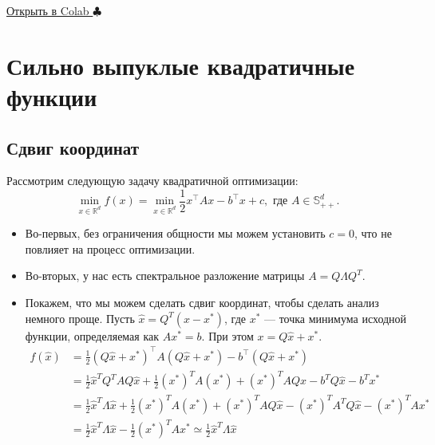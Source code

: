 \documentclass[
  russian,
  letterpaper,
  DIV=11,
  numbers=noendperiod]{scrartcl}
\providecommand{\tightlist}{%
  \setlength{\itemsep}{0pt}\setlength{\parskip}{0pt}}
\begin{document}
\href{https://colab.research.google.com/github/MerkulovDaniil/optim/blob/master/assets/Notebooks/Steepest_descent.ipynb}{Открыть
в Colab \(\clubsuit\)}

\section{Сильно выпуклые квадратичные
функции}\label{ux441ux438ux43bux44cux43dux43e-ux432ux44bux43fux443ux43aux43bux44bux435-ux43aux432ux430ux434ux440ux430ux442ux438ux447ux43dux44bux435-ux444ux443ux43dux43aux446ux438ux438}

\subsection{Сдвиг
координат}\label{ux441ux434ux432ux438ux433-ux43aux43eux43eux440ux434ux438ux43dux430ux442}

Рассмотрим следующую задачу квадратичной оптимизации: \[
\label{problem}
\min\limits_{x \in \mathbb{R}^d} f(x) =  \min\limits_{x \in \mathbb{R}^d} \dfrac{1}{2} x^\top  A x - b^\top  x + c, \text{ где } A \in \mathbb{S}^d_{++}.
\]

\begin{itemize}
\tightlist
\item
  Во-первых, без ограничения общности мы можем установить \(c = 0\), что
  не повлияет на процесс оптимизации.
\item
  Во-вторых, у нас есть спектральное разложение матрицы
  \(A = Q \Lambda Q^T\).
\item
  Покажем, что мы можем сделать сдвиг координат, чтобы сделать анализ
  немного проще. Пусть \(\hat{x} = Q^T(x - x^*)\), где \(x^*\) --- точка
  минимума исходной функции, определяемая как \(Ax^* = b\). При этом
  \(x = Q\hat{x} + x^*\). \[
    \begin{split}
     f(\hat{x}) &= \frac12  (Q\hat{x} + x^*)^\top  A (Q\hat{x} + x^*) - b^\top  (Q\hat{x} + x^*) \\
     &= \frac12 \hat{x}^T Q^TAQ\hat{x} + \frac12 (x^*)^T A (x^*) + (x^*)^TAQ\hat{x} - b^T Q\hat{x} - b^T x^*\\
     &= \frac12 \hat{x}^T \Lambda \hat{x} + \frac12 (x^*)^T A (x^*) + (x^*)^TAQ\hat{x} - (x^*)^T A^TQ\hat{x} - (x^*)^T A x^*\\
    &= \frac12 \hat{x}^T \Lambda \hat{x} - \frac12 (x^*)^T A x^* \simeq \frac12 \hat{x}^T \Lambda \hat{x} 
    \end{split}
    \]
\end{itemize}
\end{document}
